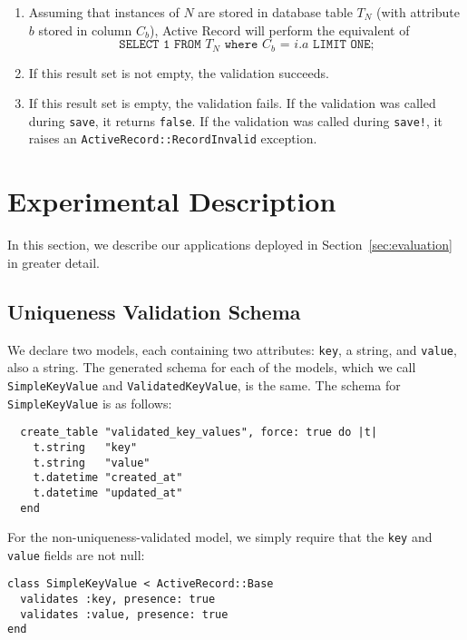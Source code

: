 \begin{enumerate} 
\small
\item Assuming that instances of $N$ are stored in database table $T_N$ (with attribute $b$ stored in column $C_b$), Active Record will perform the equivalent of $$\texttt{SELECT 1 FROM $T_N$ where $C_b$ = $i.a$ LIMIT ONE;}$$

\item If this result set is not empty, the validation succeeds.

\item If this result set is empty, the validation fails. If the validation was called during \texttt{save}, it returns \texttt{false}. If the validation was called during \texttt{save!}, it raises an \texttt{ActiveRecord::RecordInvalid} exception.

\end{enumerate}

\section{Experimental Description}
\label{sec:appendix-experiments}

\lstset{language=Ruby,basicstyle=\ttfamily\small,columns=fullflexible,frame=single}

In this section, we describe our applications deployed in Section~\ref{sec:evaluation} in greater detail.

\subsection{Uniqueness Validation Schema}
\label{sec:appendix-uniqueness-schema}

We declare two models, each containing two attributes: \texttt{key}, a string, and \texttt{value}, also a string. The generated schema for each of the models, which we call \texttt{SimpleKeyValue} and \texttt{ValidatedKeyValue}, is the same. The schema for \texttt{SimpleKeyValue} is as follows:

\begin{lstlisting}
  create_table "validated_key_values", force: true do |t|
    t.string   "key"
    t.string   "value"
    t.datetime "created_at"
    t.datetime "updated_at"
  end
\end{lstlisting}

For the non-uniqueness-validated model, we simply require that the \texttt{key} and \texttt{value} fields are not null:

\begin{lstlisting}
class SimpleKeyValue < ActiveRecord::Base
  validates :key, presence: true
  validates :value, presence: true
end
\end{lstlisting}

